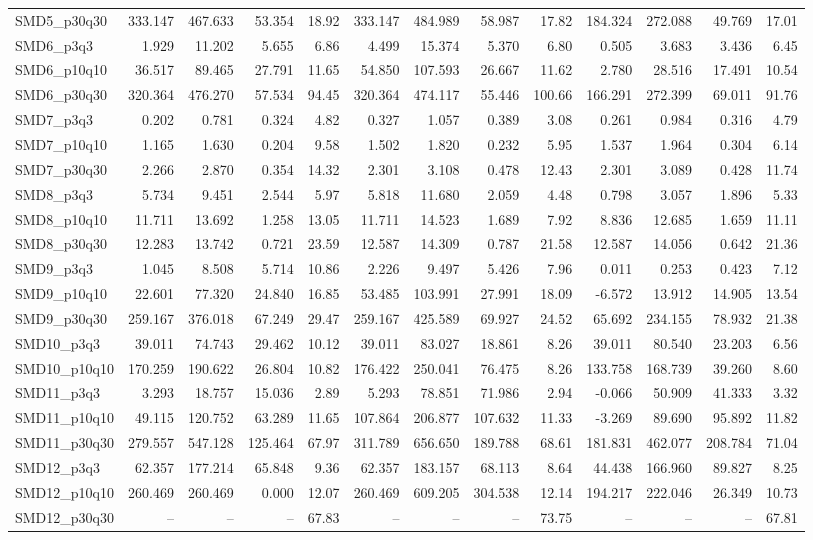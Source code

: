 \begin{longtable}{lrrrrrrrrrrrr}
SMD5\_p30q30 & 333.147 & 467.633 & 53.354 & 18.92 & 333.147 & 484.989 & 58.987 & 17.82 & 184.324 & 272.088 & 49.769 & 17.01 \\
SMD6\_p3q3 & 1.929 & 11.202 & 5.655 & 6.86 & 4.499 & 15.374 & 5.370 & 6.80 & 0.505 & 3.683 & 3.436 & 6.45 \\
SMD6\_p10q10 & 36.517 & 89.465 & 27.791 & 11.65 & 54.850 & 107.593 & 26.667 & 11.62 & 2.780 & 28.516 & 17.491 & 10.54 \\
SMD6\_p30q30 & 320.364 & 476.270 & 57.534 & 94.45 & 320.364 & 474.117 & 55.446 & 100.66 & 166.291 & 272.399 & 69.011 & 91.76 \\
SMD7\_p3q3 & 0.202 & 0.781 & 0.324 & 4.82 & 0.327 & 1.057 & 0.389 & 3.08 & 0.261 & 0.984 & 0.316 & 4.79 \\
SMD7\_p10q10 & 1.165 & 1.630 & 0.204 & 9.58 & 1.502 & 1.820 & 0.232 & 5.95 & 1.537 & 1.964 & 0.304 & 6.14 \\
SMD7\_p30q30 & 2.266 & 2.870 & 0.354 & 14.32 & 2.301 & 3.108 & 0.478 & 12.43 & 2.301 & 3.089 & 0.428 & 11.74 \\
SMD8\_p3q3 & 5.734 & 9.451 & 2.544 & 5.97 & 5.818 & 11.680 & 2.059 & 4.48 & 0.798 & 3.057 & 1.896 & 5.33 \\
SMD8\_p10q10 & 11.711 & 13.692 & 1.258 & 13.05 & 11.711 & 14.523 & 1.689 & 7.92 & 8.836 & 12.685 & 1.659 & 11.11 \\
SMD8\_p30q30 & 12.283 & 13.742 & 0.721 & 23.59 & 12.587 & 14.309 & 0.787 & 21.58 & 12.587 & 14.056 & 0.642 & 21.36 \\
SMD9\_p3q3 & 1.045 & 8.508 & 5.714 & 10.86 & 2.226 & 9.497 & 5.426 & 7.96 & 0.011 & 0.253 & 0.423 & 7.12 \\
SMD9\_p10q10 & 22.601 & 77.320 & 24.840 & 16.85 & 53.485 & 103.991 & 27.991 & 18.09 & -6.572 & 13.912 & 14.905 & 13.54 \\
SMD9\_p30q30 & 259.167 & 376.018 & 67.249 & 29.47 & 259.167 & 425.589 & 69.927 & 24.52 & 65.692 & 234.155 & 78.932 & 21.38 \\
SMD10\_p3q3 & 39.011 & 74.743 & 29.462 & 10.12 & 39.011 & 83.027 & 18.861 & 8.26 & 39.011 & 80.540 & 23.203 & 6.56 \\
SMD10\_p10q10 & 170.259 & 190.622 & 26.804 & 10.82 & 176.422 & 250.041 & 76.475 & 8.26 & 133.758 & 168.739 & 39.260 & 8.60 \\
SMD11\_p3q3 & 3.293 & 18.757 & 15.036 & 2.89 & 5.293 & 78.851 & 71.986 & 2.94 & -0.066 & 50.909 & 41.333 & 3.32 \\
SMD11\_p10q10 & 49.115 & 120.752 & 63.289 & 11.65 & 107.864 & 206.877 & 107.632 & 11.33 & -3.269 & 89.690 & 95.892 & 11.82 \\
SMD11\_p30q30 & 279.557 & 547.128 & 125.464 & 67.97 & 311.789 & 656.650 & 189.788 & 68.61 & 181.831 & 462.077 & 208.784 & 71.04 \\
SMD12\_p3q3 & 62.357 & 177.214 & 65.848 & 9.36 & 62.357 & 183.157 & 68.113 & 8.64 & 44.438 & 166.960 & 89.827 & 8.25 \\
SMD12\_p10q10 & 260.469 & 260.469 & 0.000 & 12.07 & 260.469 & 609.205 & 304.538 & 12.14 & 194.217 & 222.046 & 26.349 & 10.73 \\
SMD12\_p30q30 & -- & -- & -- & 67.83 & -- & -- & -- & 73.75 & -- & -- & -- & 67.81 \\
\end{longtable}
